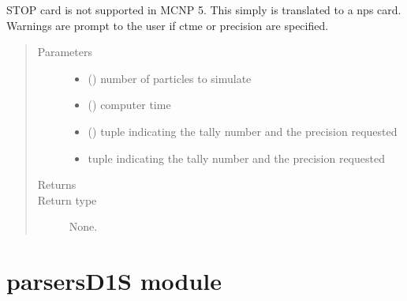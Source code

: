 \documentclass[letterpaper,10pt,english]{sphinxmanual}
\begin{document}
\begin{fulllineitems}
\begin{fulllineitems}
\label{\detokenize{api/inputgeneration:inputfile.D1S5_InputFile.add_stopCard}}
\sphinxAtStartPar
STOP card is not supported in MCNP 5. This simply is translated to a
nps card. Warnings are prompt to the user if ctme or precision are
specified.
\begin{quote}\begin{description}
\item[{Parameters}] \leavevmode\begin{itemize}
\item {} 
\sphinxAtStartPar
{} () \textendash{} number of particles to simulate

\item {} 
\sphinxAtStartPar
{} () \textendash{} computer time

\item {} 
\sphinxAtStartPar
\sphinxstyleliteralstrong{\sphinxupquote{(}} () \textendash{} tuple indicating the tally number and the precision requested

\item {} 
\sphinxAtStartPar
{}\sphinxstyleliteralstrong{\sphinxupquote{)}} \textendash{} tuple indicating the tally number and the precision requested

\end{itemize}

\item[{Returns}] \leavevmode
\sphinxAtStartPar


\item[{Return type}] \leavevmode
\sphinxAtStartPar
None.

\end{description}\end{quote}

\end{fulllineitems}


\end{fulllineitems}



\section{parsersD1S module}
\label{\detokenize{api/inputgeneration:parsersd1s-module}}
\end{document}
